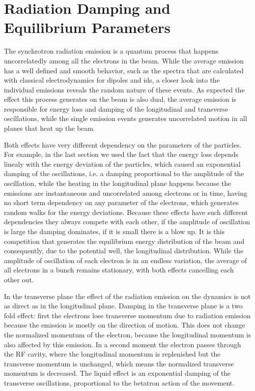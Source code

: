 \section{Radiation Damping and Equilibrium Parameters}

    The synchrotron radiation emission is a quantum process that happens uncorrelatedly among all the electrons in the beam. While the average emission has a well defined and smooth behavior, such as the spectra that are calculated with classical electrodynamics for dipoles and \gls{ids}, a closer look into the individual emissions reveals the random nature of these events. As expected the effect this process generates on the beam is also dual, the average emission is responsible for energy loss and damping of the longitudinal and transverse oscillations, while the single emission events generates uncorrelated motion in all planes that heat up the beam.

    Both effects have very different dependency on the parameters of the particles. For example, in the last section we used the fact that the energy loss depends linealy with the energy deviation of the particles, which caused an exponential damping of the oscillations, i.e. a damping proportional to the amplitude of the oscillation, while the heating in the longitudinal plane happens because the emissions are instantaneous and uncorrelated among electrons or in time, having no short term dependency on any parameter of the electrons, which generates random walks for the energy deviations. Because these effects have such different dependencies they always compete with each other, if the amplitude of oscillation is large the damping dominates, if it is small there is a blow up. It is this competition that generates the equilibrium energy distribution of the beam and consequently, due to the potential well, the longitudinal distribution. While the amplitude of oscillation of each electron is in an endless variation, the average of all electrons in a bunch remains stationary, with both effects cancelling each other out.

    In the transverse plane the effect of the radiation emission on the dynamics is not as direct as in the longitudinal plane. Damping in the transverse plane is a two fold effect: first the electrons lose transverse momentum due to radiation emission because the emission is mostly on the direction of motion. This does not change the normalized momentum of the electron, because the longitudinal momentum is also affected by this emission. In a second moment the electron passes through the RF cavity, where the longitudinal momentum is replenished but the transverse momentum is unchanged, which means the normalized transverse momentum is decreased. The liquid effect is an exponential damping of the transverse oscillations, proportional to the betatron action of the movement.

